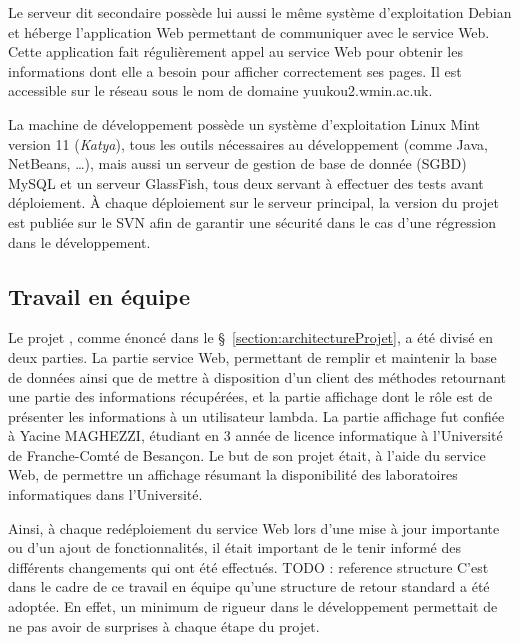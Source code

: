 Le serveur dit {\og}secondaire{\fg} poss\`ede lui aussi le m\^eme syst\`eme d'exploitation Debian et h\'eberge l'application Web permettant de communiquer avec le service Web.
Cette application fait r\'eguli\`erement appel au service Web pour obtenir les informations dont elle a besoin pour afficher correctement ses pages.
Il est accessible sur le r\'eseau sous le nom de domaine \textsf{yuukou2.wmin.ac.uk}.

La machine de d\'eveloppement poss\`ede un syst\`eme d'exploitation Linux Mint version 11 (\textit{Katya}), tous les outils n\'ecessaires au d\'eveloppement (comme Java, NetBeans, \ldots), mais aussi un serveur de gestion de base de donn\'ee (SGBD) MySQL et un serveur GlassFish, tous deux servant \`a effectuer des tests avant d\'eploiement.
\`A chaque d\'eploiement sur le serveur principal, la version du projet est publi\'ee sur le SVN afin de garantir une s\'ecurit\'e dans le cas d'une r\'egression dans le d\'eveloppement.

\subsection{Travail en \'equipe}
\label{section:travailequipe}

Le projet {\YuukouII}, comme \'enonc\'e dans le \S~\ref{section:architectureProjet}, a \'et\'e divis\'e en deux parties.
La partie service Web, permettant de remplir et maintenir la base de donn\'ees ainsi que de mettre \`a disposition d'un client des m\'ethodes retournant une partie des informations r\'ecup\'er\'ees, et la partie affichage dont le r\^ole est de pr\'esenter les informations \`a un utilisateur lambda.
La partie affichage fut confi\'ee \`a Yacine MAGHEZZI, \'etudiant en 3 ann\'ee de licence informatique \`a l'Universit\'e de Franche-Comt\'e de Besan\c{c}on.
Le but de son projet \'etait, \`a l'aide du service Web, de permettre un affichage r\'esumant la disponibilit\'e des laboratoires informatiques dans l'Universit\'e.

Ainsi, \`a chaque red\'eploiement du service Web lors d'une mise \`a jour importante ou d'un ajout de fonctionnalit\'es, il \'etait important de le tenir inform\'e des diff\'erents changements qui ont \'et\'e effectu\'es.
TODO : reference structure
C'est dans le cadre de ce travail en \'equipe qu'une structure de retour standard a \'et\'e adopt\'ee.
En effet, un minimum de rigueur dans le d\'eveloppement permettait de ne pas avoir de surprises \`a chaque \'etape du projet.

